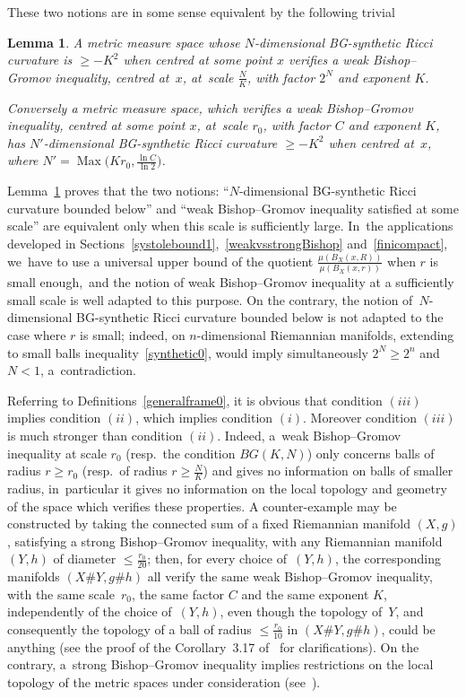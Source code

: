 \documentclass[pdftex]{sigma}
\numberwithin{equation}{section}
\newtheorem{Lemma}[theor]{Lemma}
\newcommand{\Max}{\operatorname{Max}}
\begin{document}
These two notions are in some sense equivalent by the following trivial

\begin{Lemma}\label{Bishopvssynthetic}
A metric measure space whose $N$-dimensional BG-synthetic Ricci curvature
is $\ge -K^2$ when centred at some point $x$ verifies a weak Bishop--Gromov inequality,
centred at~$x$, at~scale $\frac{N}{K}$, with factor $2^{N}$ and exponent $K$.

Conversely a metric measure space, which verifies a weak Bishop--Gromov inequality, centred at some point $x$, at~scale $r_0$, with factor $C$ and
exponent $K$, has $N'$-dimensional BG-synthetic Ricci curvature $\ge -K^2$ when centred at~$x$, where
$N' = \Max \big( K r_0, \frac{\ln C}{\ln 2} \big)$.
\end{Lemma}

Lemma~\ref{Bishopvssynthetic} proves that the two notions: ``$N$-dimensional BG-synthetic Ricci curvature boun\-ded below'' and
``weak Bishop--Gromov inequality satisfied at some scale'' are equivalent only when this scale is sufficiently large. In~the applications
developed in Sections~\ref{systolebound1},~\ref{weakvsstrongBishop} and~\ref{finicompact}, we~have to use a universal upper bound of the quotient
$\frac{\mu ( B_X(x, R))}{\mu ( B_X(x,r))}$ when $r$ is small enough,~and the notion of weak Bishop--Gromov inequality at a
sufficiently small scale is well adapted to this purpose. On the contrary, the notion of~$N$-dimensional BG-synthetic Ricci curvature bounded below
is not adapted to the case where $r$ is small; indeed, on $n$-dimensional
Riemannian manifolds, extending to small balls inequality~\eqref{synthetic0},
would imply simultaneously $2^N \ge 2^n$ and $N < 1$, a~contradiction.

Referring to Definitions~\ref{generalframe0}, it is obvious that condition $(iii)$ implies condition $(ii)$, which implies condition $(i)$. Moreover condition $(iii)$ is much stronger than condition $(ii)$.
Indeed, a~weak Bishop--Gromov inequality at scale $r_0$ (resp.\ the condition
$BG (K, N)$) only concerns balls of radius $r \ge r_0$ (resp.\ of radius $r \ge \frac{N}{K}$) and gives no information on balls of
smaller radius, in~particular it gives no information on the local topology and geometry of the space which verifies these properties. A counter-example may
be constructed by taking the connected sum of a fixed Riemannian manifold
$(X,g)$, satisfying a strong Bishop--Gromov inequality, with any Riemannian manifold $(Y,h)$ of diameter $\le \frac{r_0}{20}$; then, for every choice of~$(Y,h)$, the corresponding manifolds
$(X\# Y, g\# h)$ all verify the same weak Bishop--Gromov inequality, with
the same scale~$r_0$, the same factor $C$ and the same exponent $K$, independently of the choice of~$(Y,h)$, even though the topology of~$Y$, and consequently the topology of a ball of radius $\le \frac{r_0}{10}$ in $(X\# Y, g\# h)$, could be anything (see the proof of the Corollary~3.17 of~\cite{BCGS} for clarifications).
On the contrary, a~strong Bishop--Gromov inequality implies restrictions on the local topology of the metric spaces under consideration
(see~\cite[Theorem~5.1]{CS4}).
\end{document}
